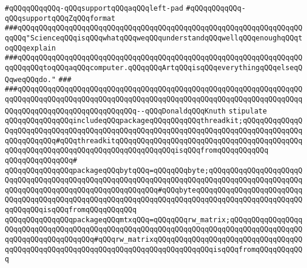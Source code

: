 \verb|#qQQqqQQqqQQq-qQQqsupportqQQqaqQQqleft-pad|\newline
\verb|#qQQqqQQqqQQq-qQQqsupportqQQqZqQQqformat|\newline
\newline
\newline
\newline
\verb|###qQQqqQQqqQQqqQQqqQQqqQQqqQQqqQQqqQQqqQQqqQQqqQQqqQQqqQQqqQQqqQQqqQQqqQQq"ScienceqQQqisqQQqwhatqQQqweqQQqunderstandqQQqwellqQQqenoughqQQqtoqQQqexplain|\newline
\verb|###qQQqqQQqqQQqqQQqqQQqqQQqqQQqqQQqqQQqqQQqqQQqqQQqqQQqqQQqqQQqqQQqqQQqqQQqqQQqtoqQQqaqQQqcomputer.qQQqqQQqArtqQQqisqQQqeverythingqQQqelseqQQqweqQQqdo."|\newline
\verb|###|\newline
\verb|###qQQqqQQqqQQqqQQqqQQqqQQqqQQqqQQqqQQqqQQqqQQqqQQqqQQqqQQqqQQqqQQqqQQqqQQqqQQqqQQqqQQqqQQqqQQqqQQqqQQqqQQqqQQqqQQqqQQqqQQqqQQqqQQqqQQqqQQqqQQqqQQqqQQqqQQqqQQqqQQqqQQqqQQq--qQQqDonaldqQQqKnuth|\newline
\newline
\newline
\newline
\verb|stipulate|\newline
\verb|qQQqqQQqqQQqqQQqincludeqQQqpackageqQQqqQQqqQQqthreadkit;qQQqqQQqqQQqqQQqqQQqqQQqqQQqqQQqqQQqqQQqqQQqqQQqqQQqqQQqqQQqqQQqqQQqqQQqqQQqqQQqqQQqqQQqqQQqqQQq#qQQqthreadkitqQQqqQQqqQQqqQQqqQQqqQQqqQQqqQQqqQQqqQQqqQQqqQQqqQQqqQQqqQQqqQQqqQQqqQQqqQQqqQQqqQQqisqQQqfromqQQqqQQqqQQq|\newline
\verb|qQQqqQQqqQQqqQQq#|\newline
\verb|qQQqqQQqqQQqqQQqpackageqQQqbytqQQq=qQQqqQQqbyte;qQQqqQQqqQQqqQQqqQQqqQQqqQQqqQQqqQQqqQQqqQQqqQQqqQQqqQQqqQQqqQQqqQQqqQQqqQQqqQQqqQQqqQQqqQQqqQQqqQQqqQQqqQQqqQQqqQQqqQQqqQQqqQQq#qQQqbyteqQQqqQQqqQQqqQQqqQQqqQQqqQQqqQQqqQQqqQQqqQQqqQQqqQQqqQQqqQQqqQQqqQQqqQQqqQQqqQQqqQQqqQQqqQQqqQQqqQQqqQQqisqQQqfromqQQqqQQqqQQq|\newline
\verb|qQQqqQQqqQQqqQQqpackageqQQqmtxqQQq=qQQqqQQqrw_matrix;qQQqqQQqqQQqqQQqqQQqqQQqqQQqqQQqqQQqqQQqqQQqqQQqqQQqqQQqqQQqqQQqqQQqqQQqqQQqqQQqqQQqqQQqqQQqqQQqqQQqqQQqqQQq#qQQqrw_matrixqQQqqQQqqQQqqQQqqQQqqQQqqQQqqQQqqQQqqQQqqQQqqQQqqQQqqQQqqQQqqQQqqQQqqQQqqQQqqQQqqQQqisqQQqfromqQQqqQQqqQQq|\newline
